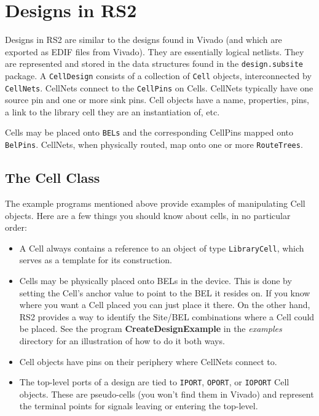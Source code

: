 \documentclass[12pt]{article}
\newcommand{\cls}[1]{{\texttt{#1}}}
\newcommand{\pkg}[1]{{\texttt{#1}}}
\newcommand{\pgm}[1]{{\textbf{#1}}}
\newcommand{\dir}[1]{{\em #1}}
\begin{document}
\section{Designs in RS2}

Designs in RS2 are similar to the designs found in Vivado (and which are
exported as EDIF files from Vivado). 
They are essentially logical netlists.  They are represented and stored in the
data structures found in the \pkg{design.subsite} package.  A \cls{CellDesign}
consists of a collection of \cls{Cell} objects, interconnected by
\cls{CellNets}.
CellNets connect to the \cls{CellPins} on Cells.  CellNets typically have one
source pin and one or more sink pins.  Cell objects have a name, properties, pins, a link to the library cell
they are an instantiation of, etc.

Cells may be placed onto \cls{BELs} and the corresponding CellPins mapped onto
\cls{BelPins}.  CellNets, when physically routed, map onto one or more
\cls{RouteTrees}.

\subsection{The Cell Class}
The example programs mentioned above provide examples of manipulating Cell
objects.  Here are a few things you should know about cells, in no particular
order: 
\begin{itemize}
\item A Cell always contains a reference to an object of type \cls{LibraryCell},
which serves as a template for its construction.
\item Cells may be physically  placed onto BELs in the device.  This is done by
setting the Cell's anchor value to point to the BEL it resides on.  If you know
where you want a Cell placed you can just place it there.  On the other hand,
RS2 provides a way to identify the Site/BEL combinations where a Cell could be
placed.  See the program \pgm{CreateDesignExample} in the \dir{examples}
directory for an illustration of how to do it both ways.
\item Cell objects have pins on their periphery where CellNets connect to.
\item The top-level ports of a design are tied to \cls{IPORT}, \cls{OPORT}, or
\cls{IOPORT} Cell objects.  These are pseudo-cells (you won't find them in
Vivado) and represent the terminal points for signals leaving or entering the top-level.  
\end{itemize}
\end{document}
